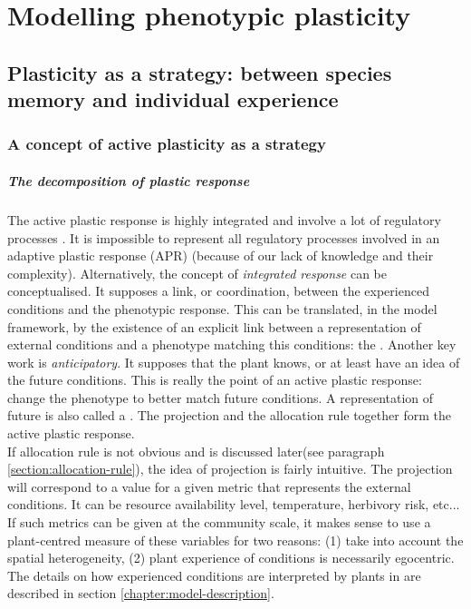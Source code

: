 \chapter{Modelling phenotypic plasticity}\label{chapter:modelling_PP}


\section{Plasticity as a strategy: between species memory and individual experience}

\subsection{A concept of active plasticity as a strategy}
\paragraph{The decomposition of plastic response}
The active plastic response is highly integrated \parencite{freschet_integrated_2015} and involve a lot of regulatory processes \parencite{nicotra_adaptive_2010}. It is impossible to represent all regulatory processes involved in an adaptive plastic response (APR) (because of our lack of knowledge and their complexity). Alternatively, the concept of \textit{integrated response} can be conceptualised. It supposes a link, or coordination, between the experienced conditions and the phenotypic response. This can be translated, in the model framework, by the existence of an explicit link between a representation of external conditions and a phenotype matching this conditions: the . Another key work is \textit{anticipatory}. It supposes that the plant knows, or at least have an idea of the future conditions. This is really the point of an active plastic response: change the phenotype to better match future conditions. A representation of future is also called a . The projection and the allocation rule together form the active plastic response.\\
If allocation rule is not obvious and is discussed later(see paragraph \ref{section:allocation-rule}), the idea of projection is fairly intuitive. The projection will correspond to a value for a given metric that represents the external conditions. It can be resource availability level, temperature, herbivory risk, etc... If such metrics can be given at the community scale, it makes sense to use a plant-centred measure of these variables for two reasons: (1) take into account the spatial heterogeneity, (2) plant experience of conditions is necessarily egocentric. The details on how experienced conditions are interpreted by plants in \model are described in section \ref{chapter:model-description}.

